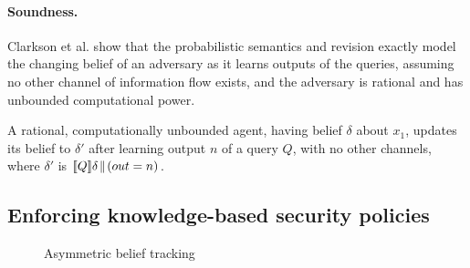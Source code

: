 \documentclass[10pt]{sigplanconf}
\begin{document}
\paragraph*{Soundness.}
Clarkson et al. show that the probabilistic semantics and revision
exactly model the changing belief of an adversary as it learns outputs
of the queries, assuming no other channel of information flow exists,
and the adversary is rational and has unbounded computational power.

\begin{theorem} \label{thm:clarkson}
A rational, computationally unbounded agent, having belief $ \delta $
about $ x_1 $, updates its belief to $ \delta' $ after learning output $n$
of a query $ Q $, with no other channels, where $ \delta' $ is
$ [\![{Q}]\!]{\delta}\!\parallel\!{\left( out = n \right)} $.
\end{theorem}

\subsection{Enforcing knowledge-based security policies}
\label{sec:kbse}

\begin{figure}
\caption{Asymmetric belief tracking}
\label{fig:asymmetric}
\end{figure}
\end{document}
